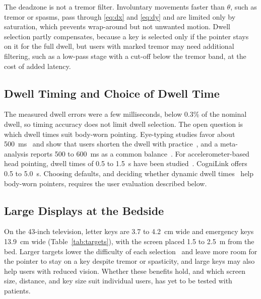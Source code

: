 \documentclass[journal]{IEEEtran}
\begin{document}
The deadzone is not a tremor filter. Involuntary movements faster than $\theta$, such as tremor or spasms, pass through \eqref{eq:dx} and \eqref{eq:dy} and are limited only by saturation, which prevents wrap-around but not unwanted motion. Dwell selection partly compensates, because a key is selected only if the pointer stays on it for the full dwell, but users with marked tremor may need additional filtering, such as a low-pass stage with a cut-off below the tremor band, at the cost of added latency.

\subsection{Dwell Timing and Choice of Dwell Time}
The measured dwell errors were a few milliseconds, below 0.3\% of the nominal dwell, so timing accuracy does not limit dwell selection. The open question is which dwell times suit body-worn pointing. Eye-typing studies favor about 500~ms~\cite{helmert2008} and show that users shorten the dwell with practice~\cite{majaranta2009}, and a meta-analysis reports 500 to 600~ms as a common balance~\cite{burnham2025}. For accelerometer-based head pointing, dwell times of 0.5 to 1.5~s have been studied~\cite{groll2020}. CogniLink offers 0.5 to 5.0~s. Choosing defaults, and deciding whether dynamic dwell times~\cite{mott2017} help body-worn pointers, requires the user evaluation described below.

\subsection{Large Displays at the Bedside}
On the 43-inch television, letter keys are 3.7 to 4.2~cm wide and emergency keys 13.9~cm wide (Table~\ref{tab:targets}), with the screen placed 1.5 to 2.5~m from the bed. Larger targets lower the difficulty of each selection~\cite{fitts1954} and leave more room for the pointer to stay on a key despite tremor or spasticity, and large keys may also help users with reduced vision. Whether these benefits hold, and which screen size, distance, and key size suit individual users, has yet to be tested with patients.
\end{document}
